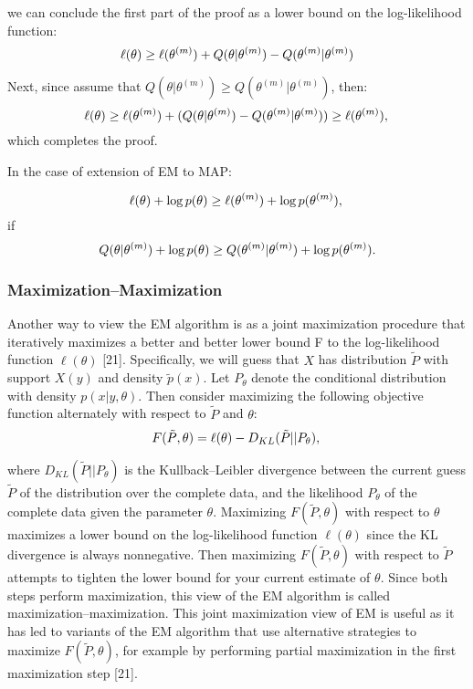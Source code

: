 \documentclass[onecolumn,12pt]{IEEEtran}
\begin{document}
we can conclude the first part of the proof as a lower bound on the log-likelihood function:
\begin{equation}
  \ell(\theta) \geq \ell(\theta^{(m)}) + Q(\theta|\theta^{(m)}) - Q(\theta^{(m)}|\theta^{(m)})  \\
\end{equation}

Next, since assume that $Q(\theta|\theta^{(m)}) \geq Q(\theta^{(m)}|\theta^{(m)})$, then:
\begin{equation}
  \ell(\theta) \geq \ell(\theta^{(m)}) + (Q(\theta|\theta^{(m)}) - Q(\theta^{(m)}|\theta^{(m)})) \geq \ell(\theta^{(m)}), \\
\end{equation}
which completes the proof.

In the case of extension of EM to MAP:

\begin{equation}
  \ell(\theta) + \log p(\theta) \geq \ell(\theta^{(m)}) + \log p(\theta^{(m)}), \\
\end{equation}
if
\begin{equation}
  Q(\theta|\theta^{(m)}) + \log p(\theta) \geq Q(\theta^{(m)}|\theta^{(m)}) + \log p(\theta^{(m)}). \\
\end{equation}

\subsubsection{Maximization–Maximization}
Another way to view the EM algorithm is as a joint maximization procedure that iteratively maximizes a better and better lower bound F to the log-likelihood function $\ell(\theta)$ [21]. Specifically, we will guess that $X$ has distribution $\tilde{P}$ with support $X(y)$ and density $\tilde{p}(x)$. Let $P_{\theta}$ denote the conditional distribution with density $p(x|y,\theta)$. Then consider maximizing the following objective function alternately with respect to $\tilde{P}$ and $\theta$:
\begin{equation}
  F(\tilde{P},\theta) = \ell(\theta) - D_{KL}(\tilde{P}||P_{\theta}), \\
\end{equation}

where $D_{KL}(\tilde{P}||P_{\theta})$ is the Kullback–Leibler divergence between the current guess $\tilde{P}$ of the distribution over the complete data, and the likelihood $P_{\theta}$ of the complete data given the parameter $\theta$. Maximizing $F(\tilde{P},\theta)$ with respect to $\theta$ maximizes a lower bound on the log-likelihood function $\ell(\theta)$ since the KL divergence is always nonnegative. Then maximizing $F(\tilde{P},\theta)$ with respect to $\tilde{P}$ attempts to tighten the lower bound for your current estimate of $\theta$. Since both steps perform maximization, this view of the EM algorithm is called maximization–maximization. This joint maximization view of EM is useful as it has led to variants of the EM algorithm that use alternative strategies to maximize $F(\tilde{P},\theta)$, for example by performing partial maximization in the first maximization step [21].
\end{document}

